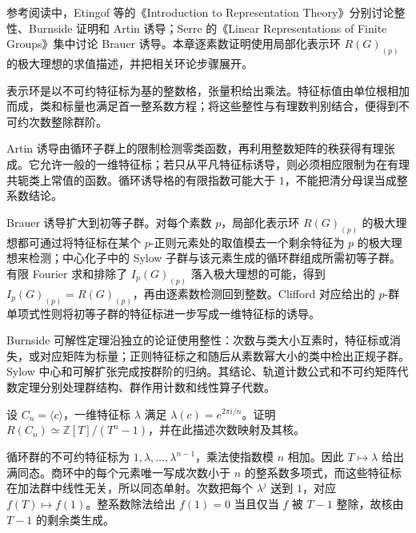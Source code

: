 \ProseParagraphBreak
参考阅读中，Etingof 等的《Introduction to Representation Theory》\cite[Sections 5.2--5.4; Section 5.26]{EtingofEtAl2011RepresentationTheory}分别讨论整性、Burnside 证明和 Artin 诱导；Serre 的《Linear Representations of Finite Groups》\cite[Chapter 10, pp. 74--80]{Serre1977FiniteRepresentations}集中讨论 Brauer 诱导。本章逐素数证明使用局部化表示环 \(R(G)_{(p)}\) 的极大理想的求值描述，并把相关环论步骤展开。








\begin{chaptersummary}
	表示环是以不可约特征标为基的整数格，张量积给出乘法。特征标值由单位根相加而成，类和标量也满足首一整系数方程；将这些整性与有理数判别结合，便得到不可约次数整除群阶。

	\ProseParagraphBreak
	Artin 诱导由循环子群上的限制检测零类函数，再利用整数矩阵的秩获得有理张成。它允许一般的一维特征标；若只从平凡特征标诱导，则必须相应限制为在有理共轭类上常值的函数。循环诱导格的有限指数可能大于 \(1\)，不能把清分母误当成整系数结论。

	\ProseParagraphBreak
	Brauer 诱导扩大到初等子群。对每个素数 \(p\)，局部化表示环 \(R(G)_{(p)}\) 的极大理想都可通过将特征标在某个 \(p\)-正则元素处的取值模去一个剩余特征为 \(p\) 的极大理想来检测；中心化子中的 Sylow 子群与该元素生成的循环群组成所需初等子群。有限 Fourier 求和排除了 \(I_p(G)_{(p)}\) 落入极大理想的可能，得到 \(I_p(G)_{(p)}=R(G)_{(p)}\)，再由逐素数检测回到整数。Clifford 对应给出的 \(p\)-群单项式性则将初等子群的特征标进一步写成一维特征标的诱导。

	\ProseParagraphBreak
	Burnside 可解性定理沿独立的论证使用整性：次数与类大小互素时，特征标或消失，或对应矩阵为标量；正则特征标之和随后从素数幂大小的类中检出正规子群。Sylow 中心和可解扩张完成按群阶的归纳。其结论、轨道计数公式和不可约矩阵代数定理分别处理群结构、群作用计数和线性算子代数。
\end{chaptersummary}

\BookExercises

\begin{exercise}\label{b5:ex:05-cyclic-ring}
	设 \(C_n=\langle c\rangle\)，一维特征标 \(\lambda\) 满足 \(\lambda(c)=e^{2\pi i/n}\)。证明 \(R(C_n)\simeq\mathbb Z[T]/(T^n-1)\)，并在此描述次数映射及其核。
\end{exercise}
\begin{solution}
	循环群的不可约特征标为 \(1,\lambda,\ldots,\lambda^{n-1}\)，乘法使指数模 \(n\) 相加。因此 \(T\mapsto\lambda\) 给出满同态。商环中的每个元素唯一写成次数小于 \(n\) 的整系数多项式，而这些特征标在加法群中线性无关，所以同态单射。次数把每个 \(\lambda^j\) 送到 \(1\)，对应 \(f(T)\mapsto f(1)\)。整系数除法给出 \(f(1)=0\) 当且仅当 \(f\) 被 \(T-1\) 整除，故核由 \(T-1\) 的剩余类生成。
\end{solution}

